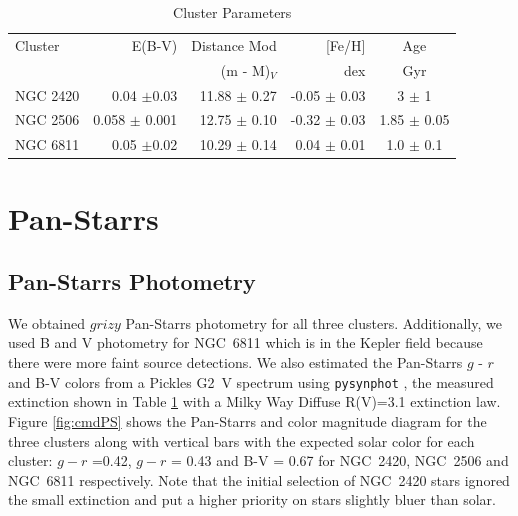 \documentclass{aastex6}
\newcommand{\DHSresApprox}{300}
\begin{document}
\begin{table}
\centering
\caption{Cluster Parameters}\label{tab:clusterProp}
\begin{tabular}{lrrrc}
\hline \hline
Cluster   					&  E(B-V) 			& Distance Mod 	& [Fe/H] 			& Age \\
          					&     				&    (m - M)$_V$	& 	dex 			& Gyr \\
\hline \hline
NGC 2420\tablenotemark{a}	& 0.04 $\pm$0.03	&  11.88 $\pm$ 0.27	& -0.05 $\pm$ 0.03	& 3 $\pm$ 1 \\
NGC 2506\tablenotemark{b}	& 0.058 $\pm$ 0.001	&  12.75 $\pm$ 0.10 	& -0.32 $\pm$ 0.03	& 1.85 $\pm$ 0.05 \\
NGC 6811\tablenotemark{c}	& 0.05 $\pm$0.02	& 10.29 $\pm$ 0.14	& 0.04 $\pm$ 0.01 	& 1.0 $\pm$ 0.1 \\
\hline
\end{tabular}
\end{table}

\section{Pan-Starrs}
\subsection{Pan-Starrs Photometry}

We obtained $grizy$ Pan-Starrs photometry \citep{magnier2013photLadder,schlafly2012photcal,tonry2012panstarrsPhot} for all three clusters.
Additionally, we used \citet{janes2013keplerPhot} B and V photometry for NGC~6811 which is in the Kepler field because there were more faint source detections.
We also estimated the Pan-Starrs $g$ - $r$ and B-V colors from a Pickles G2~V spectrum using \texttt{pysynphot} \citep{lim2015pysynphot}, the measured extinction shown in Table \ref{tab:clusterProp} with a Milky Way Diffuse R(V)=3.1 \citet{cardelli1989} extinction law.
Figure \ref{fig:cmdPS} shows the Pan-Starrs and \citet{janes2013keplerPhot} color magnitude diagram for the three clusters along with vertical bars with the expected solar color for each cluster: $g-r$ =0.42, $g-r$ = 0.43 and B-V = 0.67 for NGC~2420, NGC~2506 and NGC~6811 respectively.
Note that the initial selection of NGC~2420 stars ignored the small extinction and put a higher priority on stars slightly bluer than solar.
\end{document}
